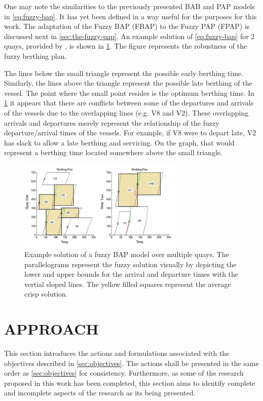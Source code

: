 \documentclass[ee,msthesis]{usuthesis}
\begin{document}
One may note the similarities to the previously presented BAB and PAP models in \ref{eq:fuzzy-bap}. It has yet been defined
in a way useful for the purposes for this work. The adaptation of the Fuzzy BAP (FBAP) to the Fuzzy PAP (FPAP) is
discussed next in \ref{sec:the-fuzzy-pap}. An example solution of \ref{eq:fuzzy-bap} for 2 quays, provided by
\cite{bello-2019-fuzzy-activ}, is shown in \ref{fig:bap-example-solution}. The figure represents the robustness of the fuzzy
berthing plan.

The lines below the small triangle represent the possible early berthing time. Similarly, the lines above the triangle
represent the possible late berthing of the vessel. The point where the small point resides is the optimum berthing
time. In \ref{fig:bap-example-solution} it appears that there are conflicts between some of the departures and arrivals of the
vessels due to the overlapping lines (e.g. V8 and V2). These overlapping arrivals and departures merely represent the
relationship of the fuzzy departure/arrival times of the vessels. For example, if V8 were to depart late, V2 has slack
to allow a late berthing and servicing. On the graph, that would represent a berthing time located somewhere above the
small triangle.

\begin{figure}[h]
\centering
\includegraphics[width=0.7\textwidth]{./img/bap-example-fuzzy-solution.png}
\caption{\label{fig:bap-example-solution}Example solution of a fuzzy BAP model over multiple quays. The parallelograms represent the fuzzy solution visually by depicting the lower and upper bounds for the arrival and departure times with the vertial sloped lines. The yellow filled squares represent the average crisp solution.}
\end{figure}
\chapter{APPROACH}
\label{sec:approach}
This section introduces the actions and formulations associated with the objectives described in \ref{sec:objectives}. The
actions shall be presented in the same order as \ref{sec:objectives} for consistency. Furthermore, as some of the research
proposed in this work has been completed, this section aims to identify complete and incomplete aspects of the research
as its being presented.
\end{document}
